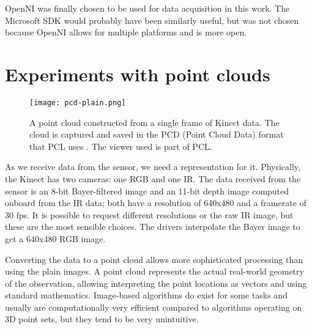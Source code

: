 OpenNI was finally chosen to be used for data acquisition in this work. The Microsoft SDK would probably have been similarly useful, but was not chosen because OpenNI allows for multiple platforms and is more open.

\section{Experiments with point clouds}

\begin{figure}
    \centering
    \texttt{[image: pcd-plain.png]}
    \caption{A point cloud constructed from a single frame of Kinect data. The cloud is captured and saved in the PCD (Point Cloud Data) format that PCL uses \citep{pcdspec}. The viewer used is part of PCL.}
    \label{fig:pcd-plain}
\end{figure}

As we receive data from the sensor, we need a representation for it. Physically, the Kinect has two cameras: one RGB and one IR. The data received from the sensor is an 8-bit Bayer-filtered image and an 11-bit depth image computed onboard from the IR data; both have a resolution of 640x480 and a framerate of 30 fps. It is possible to request different resolutions or the raw IR image, but these are the most sensible choices. The drivers interpolate the Bayer image to get a 640x480 RGB image.

Converting the data to a point cloud allows more sophisticated processing than using the plain images. A point cloud represents the actual real-world geometry of the observation, allowing interpreting the point locations as vectors and using standard mathematics. Image-based algorithms do exist for some tasks and usually are computationally very efficient compared to algorithms operating on 3D point sets, but they tend to be very unintuitive.

